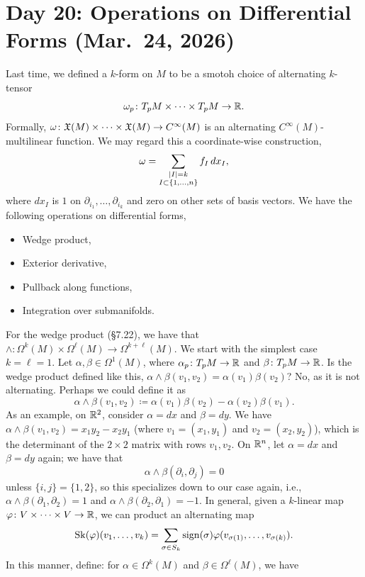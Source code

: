 \section{Day 20: Operations on Differential Forms (Mar.\ 24, 2026)}
Last time, we defined a $k$-form on $M$ to be a smotoh choice of alternating $k$-tensor
\[ \omega_p \colon T_p M \times \dots \times T_p M \to \mathbb R. \]
Formally, $\omega \colon \mathfrak X(M) \times \dots \times \mathfrak X(M) \to C^\infty(M)$ is an alternating $C^\infty(M)$-multilinear function. We may regard this a coordinate-wise construction,
\[ \omega = \sum_{\substack{\left\lvert I \right\rvert = k \\ I \subset \{1, \dots, n\}}} f_I \, dx_I, \]
where $dx_I$ is $1$ on $\partial_{i_1}, \dots, \partial_{i_k}$ and zero on other sets of basis vectors. We have the following operations on differential forms,
\begin{itemize}
    \item Wedge product,
    \item Exterior derivative,
    \item Pullback along functions,
    \item Integration over submanifolds.
\end{itemize}
For the wedge product (\S7.22), we have that $\wedge \colon \Omega^k(M) \times \Omega^\ell(M) \to \Omega^{k+\ell}(M)$. We start with the simplest case $k = \ell = 1$. Let $\alpha, \beta \in \Omega^1(M)$, where $\alpha_p \colon T_p M \to \mathbb R$ and $\beta \colon T_p M \to \mathbb R$. Is the wedge product defined like this, $\alpha \wedge \beta(v_1, v_2) = \alpha(v_1) \beta(v_2)$? No, as it is not alternating. Perhaps we could define it as
\[ \alpha \wedge \beta(v_1, v_2) \coloneq \alpha(v_1) \beta(v_2) - \alpha(v_2) \beta(v_1). \]
As an example, on $\mathbb R^2$, consider $\alpha = dx$ and $\beta = dy$. We have $\alpha \wedge \beta(v_1, v_2) = x_1y_2 - x_2y_1$ (where $v_1 = (x_1, y_1)$ and $v_2 = (x_2, y_2)$), which is the determinant of the $2 \times 2$ matrix with rows $v_1, v_2$. On $\mathbb R^n$, let $\alpha = dx$ and $\beta = dy$ again; we have that
\[ \alpha \wedge \beta(\partial_i, \partial_j) = 0 \]
unless $\{i, j\} = \{1, 2\}$, so this specializes down to our case again, i.e., $\alpha \wedge \beta(\partial_1, \partial_2) = 1$ and $\alpha \wedge \beta(\partial_2, \partial_1) = -1$. In general, given a $k$-linear map $\varphi \colon V \times \dots \times V \to \mathbb R$, we can product an alternating map
\[ \operatorname{Sk}(\varphi)(v_1, \dots, v_k) = \sum_{\sigma \in S_k} \mathrm{sign}(\sigma) \varphi(v_{\sigma(1)}, \dots, v_{\sigma(k)}). \]
In this manner, define: for $\alpha \in \Omega^k(M)$ and $\beta \in \Omega^\ell(M)$, we have
